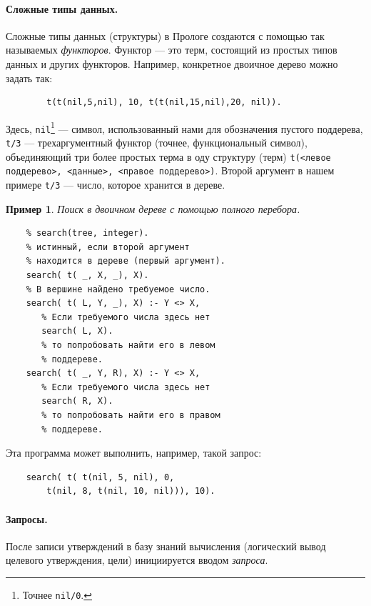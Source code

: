 \documentclass[12pt, openany, twoside]{book} %
\newtheorem{example}{Пример}[chapter]
\begin{document}
\paragraph{Сложные типы данных.}\label{sec:complex_data}
Сложные типы данных (структуры) в Прологе создаются с помощью так называемых {\em функторов}. Функтор --- это терм, состоящий из простых типов данных и других функторов. Например, конкретное двоичное дерево можно задать так:
{\tt\begin{verbatim}
        t(t(nil,5,nil), 10, t(t(nil,15,nil),20, nil)).
\end{verbatim}}
Здесь, \texttt{nil}\footnote{Точнее \texttt{nil/0}.} --- символ, использованный нами для обозначения пустого поддерева, \texttt{t/3} --- трехаргументный функтор (точнее, функциональный символ), объединяющий три более простых терма в оду структуру (терм) \texttt{t(<левое поддерево>, <данные>, <правое поддерево>)}. Второй аргумент в нашем примере \texttt{t/3} --- число, которое хранится в дереве.

\begin{example} Поиск в двоичном дереве с помощью полного перебора.
\label{ex:treesearch}
\end{example}
{\tt\begin{verbatim}
    % search(tree, integer).
    % истинный, если второй аргумент
    % находится в дереве (первый аргумент).
    search( t( _, X, _), X).
    % В вершине найдено требуемое число.
    search( t( L, Y, _), X) :- Y <> X,
       % Если требуемого числа здесь нет
       search( L, X).
       % то попробовать найти его в левом
       % поддереве.
    search( t( _, Y, R), X) :- Y <> X,
       % Если требуемого числа здесь нет
       search( R, X).
       % то попробовать найти его в правом
       % поддереве.
\end{verbatim}}
\noindent Эта программа может выполнить, например, такой запрос:
{\tt\begin{verbatim}
    search( t( t(nil, 5, nil), 0,
        t(nil, 8, t(nil, 10, nil))), 10).
\end{verbatim}}

\paragraph{Запросы.} После записи утверждений в базу знаний вычисления (логический вывод целевого утверждения, цели) инициируется вводом \emph{запроса}.
\end{document}

